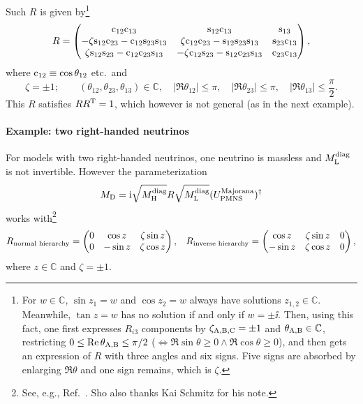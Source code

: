 \documentclass[CheatSheet]{subfiles}
\newcommand\MD[1][]{M_{\mathrm{D}#1}}
\begin{document}
Such $R$ is given by\footnote{For $w\in\mathbb C$, $\sin z_1=w$ and $\cos z_2=w$ always have solutions $z_{1,2}\in\mathbb C$. Meanwhile, $\tan z=w$ has no solution if and only if $w=\pm \ii$. Then, using this fact, one first expresses $R_{i3}$ components by $\zeta_{\mathrm{A,B,C}}=\pm1$ and $\theta_{\mathrm{A,B}}\in\mathbb C$, restricting $0\le\mathop{\mathrm{Re}}\theta_{\mathrm{A,B}}\le\pi/2$ ($\Leftrightarrow\Re{\sin{\theta}}\ge0\land\Re\cos\theta\ge0$), and then gets an expression of $R$ with three angles and six signs. Five signs are absorbed by enlarging $\Re\theta$ and one sign remains, which is $\zeta$.}
\begin{equation}
 R=\begin{pmatrix}
 \mathrm{c}_{12} \mathrm{c}_{13} & \mathrm{s}_{12} \mathrm{c}_{13} & \mathrm{s}_{13} \\
 -\zeta \mathrm{s}_{12} \mathrm{c}_{23}-\mathrm{c}_{12} \mathrm{s}_{23} \mathrm{s}_{13} & \zeta \mathrm{c}_{12} \mathrm{c}_{23} -\mathrm{s}_{12} \mathrm{s}_{23} \mathrm{s}_{13} & \mathrm{s}_{23} \mathrm{c}_{13} \\
  \zeta \mathrm{s}_{12} \mathrm{s}_{23}-\mathrm{c}_{12} \mathrm{c}_{23} \mathrm{s}_{13} & -\zeta\mathrm{c}_{12} \mathrm{s}_{23} -\mathrm{s}_{12} \mathrm{c}_{23} \mathrm{s}_{13} & \mathrm{c}_{23} \mathrm{c}_{13}
\end{pmatrix},
\end{equation}
where $\mathrm{c}_{12}\equiv \cos{\theta_{12}}$ etc.\ and
\begin{equation}
 \zeta=\pm1; \qquad
(\theta_{12},\theta_{23},\theta_{13})\in\mathbb C,\quad
|\Re\theta_{12}|\le\pi, \quad |\Re\theta_{23}|\le\pi,  \quad |\Re\theta_{13}|\le\frac{\pi}{2}.
\end{equation}
This $R$ satisfies $RR^{\mathrm{T}}=1$, which however is not general (as in the next example).

\paragraph{Example: two right-handed neutrinos}
For models with two right-handed neutrinos, one neutrino is massless and $M_{\mathrm{L}}^{\text{diag}}$ is not invertible. However the parameterization
\begin{equation}
 \MD = \ii \sqrt{M\w H^\text{diag}}R\sqrt{M\w L^\text{diag}}(U^{\text{Majorana}}\w{PMNS} )^\dagger
\end{equation}
works with\footnote{See, e.g., Ref.~\cite{Brdar:2019iem}. Sho also thanks Kai Schmitz for his note.}
\begin{align}
 R_{\text{normal hierarchy}}&=\begin{pmatrix}0 & \cos z & \zeta\sin z \\ 0 & -\sin z & \zeta \cos z\end{pmatrix},&
 R_{\text{inverse hierarchy}}=\begin{pmatrix}\cos z & \zeta\sin z &0 \\ -\sin z & \zeta \cos z & 0\end{pmatrix},
\end{align}
where $z\in\mathbb C$ and $\zeta=\pm1$.
\end{document}
